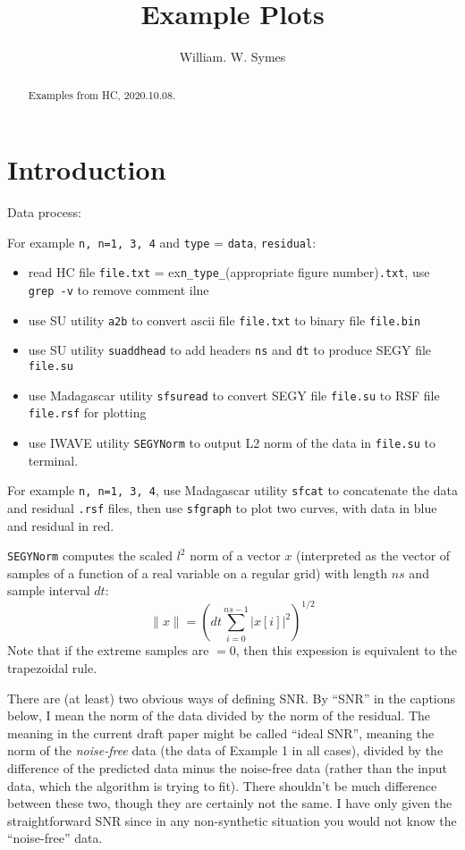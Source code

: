\title{Example Plots}
\author{William. W. Symes }



\maketitle
\begin{abstract}
Examples from HC, 2020.10.08.
\end{abstract}

\section{Introduction}
Data process:

For example {\tt n, n=1, 3, 4} and {\tt type} = {\tt data}, {\tt residual}:
\begin{itemize}
\item read HC file {\tt file.txt} = ex{\tt n\_type\_}(appropriate figure number){\tt.txt}, use {\tt grep -v} to remove comment ilne
\item use SU utility {\tt a2b} to convert ascii file {\tt file.txt} to binary file {\tt file.bin}
\item use SU utility {\tt suaddhead} to add headers {\tt ns} and {\tt dt} to produce SEGY file {\tt file.su}
\item use Madagascar utility {\tt sfsuread} to convert SEGY file {\tt file.su} to RSF file {\tt file.rsf} for plotting
\item use IWAVE utility {\tt SEGYNorm} to output L2 norm of the data in {\tt file.su} to terminal.
\end{itemize}

For example  {\tt n, n=1, 3, 4}, use Madagascar utility {\tt sfcat} to concatenate the data and residual {\tt .rsf} files, then use {\tt sfgraph} to plot two curves, with data in blue and residual in red.

{\tt SEGYNorm} computes the scaled $l^2$ norm of a vector $x$ (interpreted as the vector of samples of a function of a real variable on a regular grid) with length $ns$ and sample interval $dt$:
\[
  \|x\| = \left(dt \sum_{i=0}^{ns-1} |x[i]|^2\right)^{1/2}
\]
Note that if the extreme samples are $=0$, then this expession is equivalent to the trapezoidal rule.

There are (at least) two obvious ways of defining SNR. By ``SNR'' in the captions below, I mean the norm of the data divided by the norm of the residual. The meaning in the current draft paper might be called ``ideal SNR'', meaning the norm of the {\em noise-free} data (the data of Example 1 in all cases), divided by the difference of the predicted data minus the noise-free data (rather than the input data, which the algorithm is trying to fit). There shouldn't be much difference between these two, though they are certainly not the same. I have only given the straightforward SNR since in any non-synthetic situation you would not know the ``noise-free'' data.

